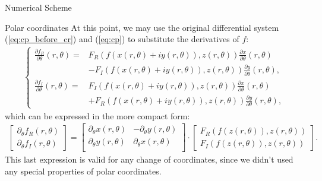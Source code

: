 \begin{section}{Numerical Scheme}
\begin{subsection}{Polar coordinates}
      At this point, we may use the original differential system
      (\ref{eq:cp_before_cr}) and (\ref{eq:cp}) to substitute the
      derivatives of $f$:
      \begin{align}
\left\{
        \begin{aligned}
          \frac{\partial f_{R}}{\partial \theta}(r,\theta) =& F_{R}(f(x(r,\theta)+iy(r,\theta)),z(r,\theta))\frac{\partial x}{\partial \theta}(r,\theta) \\
          &-F_{I}(f(x(r,\theta)+iy(r,\theta)),z(r,\theta))\frac{\partial y}{\partial \theta}(r,\theta),\\
          \frac{\partial f_{I}}{\partial \theta}(r,\theta) =& F_{I}(f(x(r,\theta)+iy(r,\theta)),z(r,\theta))\frac{\partial x}{\partial \theta}(r,\theta) \\
          &+ F_{R}(f(x(r,\theta)+iy(r,\theta)),z(r,\theta))\frac{\partial y}{\partial \theta}(r,\theta),
        \end{aligned}
        \right.
      \end{align}
      which can be expressed in the more compact form:
      \begin{align}
        \begin{bmatrix}
          \partial_\theta f_{R}(r,\theta)\\
          \partial_\theta f_{I}(r,\theta)
        \end{bmatrix}
        = 
        \begin{bmatrix}
          \partial_\theta x(r,\theta) & -\partial_\theta y(r,\theta)\\
          \partial_\theta y(r,\theta) & \partial_\theta x(r,\theta)\\
        \end{bmatrix}\cdot
        \begin{bmatrix}
          F_{R}(f(z(r,\theta)), z(r,\theta))\\
          F_{I}(f(z(r,\theta)), z(r,\theta))
        \end{bmatrix}.
      \end{align}
      This last expression is valid for any change of coordinates,
      since we didn't used any special properties of polar
      coordinates.
      

\end{subsection}
\end{section}
